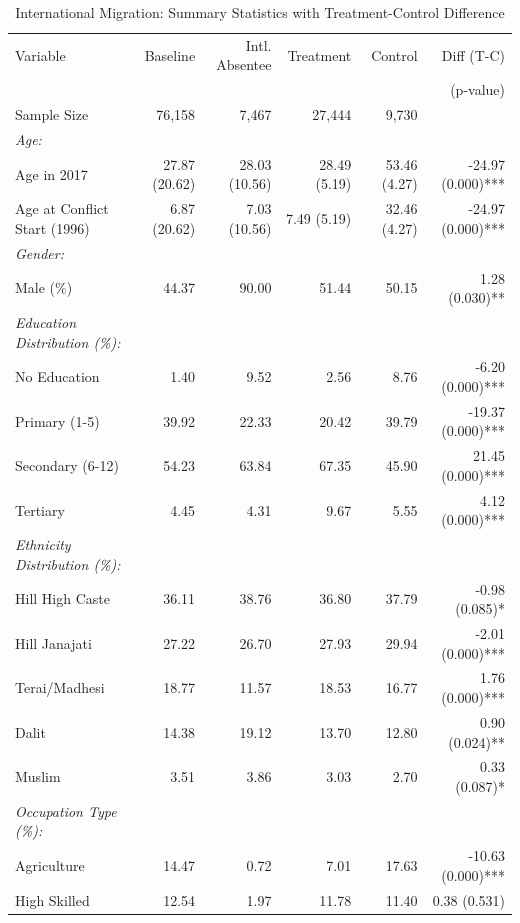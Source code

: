 \begin{table}[htbp]
\centering
\caption{International Migration: Summary Statistics with Treatment-Control Difference}
\label{tab:intl_migration_summary}
\small
\begin{tabular}{lrrrrr}
\toprule
Variable & Baseline & Intl. Absentee & Treatment & Control & Diff (T-C) \\
 & & & & & (p-value) \\
\midrule
Sample Size & 76,158 & 7,467 & 27,444 & 9,730 & \\
\addlinespace
\textit{Age:} & & & & & \\
Age in 2017 & 27.87 (20.62) & 28.03 (10.56) & 28.49 (5.19) & 53.46 (4.27) & -24.97 (0.000)*** \\
Age at Conflict Start (1996) & 6.87 (20.62) & 7.03 (10.56) & 7.49 (5.19) & 32.46 (4.27) & -24.97 (0.000)*** \\
\addlinespace
\textit{Gender:} & & & & & \\
Male (\%) & 44.37 & 90.00 & 51.44 & 50.15 & 1.28 (0.030)** \\
\addlinespace
\textit{Education Distribution (\%):} & & & & & \\
\quad No Education & 1.40 & 9.52 & 2.56 & 8.76 & -6.20 (0.000)*** \\
\quad Primary (1-5) & 39.92 & 22.33 & 20.42 & 39.79 & -19.37 (0.000)*** \\
\quad Secondary (6-12) & 54.23 & 63.84 & 67.35 & 45.90 & 21.45 (0.000)*** \\
\quad Tertiary & 4.45 & 4.31 & 9.67 & 5.55 & 4.12 (0.000)*** \\
\addlinespace
\textit{Ethnicity Distribution (\%):} & & & & & \\
\quad Hill High Caste & 36.11 & 38.76 & 36.80 & 37.79 & -0.98 (0.085)* \\
\quad Hill Janajati & 27.22 & 26.70 & 27.93 & 29.94 & -2.01 (0.000)*** \\
\quad Terai/Madhesi & 18.77 & 11.57 & 18.53 & 16.77 & 1.76 (0.000)*** \\
\quad Dalit & 14.38 & 19.12 & 13.70 & 12.80 & 0.90 (0.024)** \\
\quad Muslim & 3.51 & 3.86 & 3.03 & 2.70 & 0.33 (0.087)* \\
\addlinespace
\textit{Occupation Type (\%):} & & & & & \\
\quad Agriculture & 14.47 & 0.72 & 7.01 & 17.63 & -10.63 (0.000)*** \\
\quad High Skilled & 12.54 & 1.97 & 11.78 & 11.40 & 0.38 (0.531) \\

\end{tabular}
\end{table}
